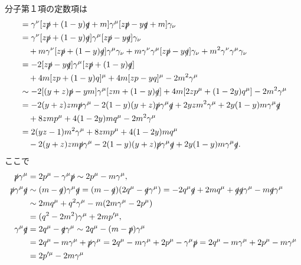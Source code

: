 分子第１項の定数項は
\begin{align*}
  &= \gamma^\nu [z\slashed{p}+(1-y)\slashed{q}+m] \gamma^\mu [z\slashed{p}-y\slashed{q}+m] \gamma_\nu \\
  &= \gamma^\nu [z\slashed{p}+(1-y)\slashed{q}] \gamma^\mu [z\slashed{p}-y\slashed{q}] \gamma_\nu \\
  &\quad + m \gamma^\nu [z\slashed{p}+(1-y)\slashed{q}] \gamma^\mu \gamma_\nu
  + m \gamma^\nu \gamma^\mu [z\slashed{p}-y\slashed{q}] \gamma_\nu
  + m^2\gamma^\nu \gamma^\mu \gamma_\nu \\
  &= -2 [z\slashed{p}-y\slashed{q}] \gamma^\mu [z\slashed{p}+(1-y)\slashed{q}] \\
  &\quad + 4m [zp+(1-y)q]^\mu + 4m [zp-yq]^\mu - 2m^2 \gamma^\mu \\
  &\sim -2 [(y+z)\slashed{p}-ym] \gamma^\mu [zm+(1-y)\slashed{q}] + 4m [2zp^\mu+(1-2y)q^\mu] - 2m^2 \gamma^\mu \\
  &= -2(y+z)zm\slashed{p}\gamma^\mu - 2(1-y)(y+z)\slashed{p}\gamma^\mu\slashed{q} + 2yzm^2\gamma^\mu + 2y(1-y)m \gamma^\mu\slashed{q} \\
  &\quad + 8zmp^\mu + 4(1-2y)mq^\mu - 2m^2 \gamma^\mu \\
  &= 2(yz-1) m^2\gamma^\mu + 8zmp^\mu + 4(1-2y)mq^\mu \\
  &\quad -2(y+z)zm\slashed{p}\gamma^\mu - 2(1-y)(y+z)\slashed{p}\gamma^\mu\slashed{q} + 2y(1-y)m \gamma^\mu\slashed{q} .
\end{align*}
ここで
\begin{align*}
  \slashed{p}\gamma^\mu &= 2p^\mu - \gamma^\mu\slashed{p} \sim 2p^\mu - m\gamma^\mu , \\
  \slashed{p}\gamma^\mu\slashed{q} &\sim (m-\slashed{q}) \gamma^\mu \slashed{q}
  = (m-\slashed{q}) (2q^\mu - \slashed{q} \gamma^\mu )
  = - 2q^\mu\slashed{q} + 2mq^\mu + \slashed{q}\slashed{q}\gamma^\mu - m \slashed{q}\gamma^\mu \\
  &\sim 2mq^\mu + q^2\gamma^\mu - m(2m\gamma^\mu - 2p^\mu) \\
  &= (q^2-2m^2) \gamma^\mu + 2mp'^\mu , \\
  \gamma^\mu\slashed{q} &= 2q^\mu - \slashed{q}\gamma^\mu \sim 2q^\mu - (m-\slashed{p})\gamma^\mu \\
  &= 2q^\mu - m\gamma^\mu + \slashed{p}\gamma^\mu
  = 2q^\mu - m\gamma^\mu + 2p^\mu - \gamma^\mu\slashed{p}
  = 2q^\mu - m\gamma^\mu + 2p^\mu - m\gamma^\mu \\
  &= 2p'^\mu - 2m\gamma^\mu
\end{align*}
